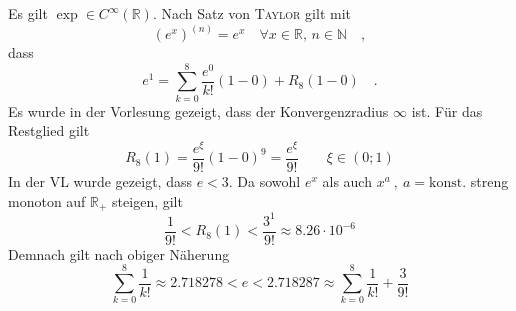 \documentclass[a4paper, 12pt]{scrartcl}
\begin{document}
Es gilt $\exp \in C^\infty(\mathbb{R})$. Nach Satz von \textsc{Taylor} gilt mit
\[ (e^x)^{(n)} = e^x \quad \forall x \in \mathbb{R},\,n \in \mathbb{N} \quad, \]
dass
\[ e^1 = \sum_{k=0}^8 \frac{e^0}{k!}(1-0) + R_8(1-0) \quad.\]
Es wurde in der Vorlesung gezeigt, dass der Konvergenzradius $\infty$ ist. Für das Restglied gilt
\[ R_8(1) = \frac{e^\xi}{9!}(1-0)^9 = \frac{e^\xi}{9!}\qquad \xi \in (0;1) \]
In der VL wurde gezeigt, dass $e < 3$. Da sowohl $e^x$ als auch $x^a ~,~ a=\text{konst.}$ streng monoton auf $\mathbb{R}_+$ steigen, gilt
\[ \frac{1}{9!} < R_8(1) < \frac{3^1}{9!} \approx 8.26 \cdot 10^{-6} \]
Demnach gilt nach obiger Näherung
\[ \sum_{k=0}^8 \frac{1}{k!} \approx 2.718278 < e < 2.718287 \approx \sum_{k=0}^8 \frac{1}{k!} + \frac{3}{9!}  \]
\end{document}
